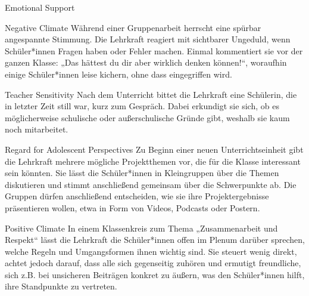 \begin{mapping}{Emotional Support}
    \begin{answer}
        Negative Climate
        \ismappedto
        Während einer Gruppenarbeit herrscht eine spürbar angespannte Stimmung. Die Lehrkraft reagiert mit sichtbarer Ungeduld, wenn Schüler*innen Fragen haben oder Fehler machen. Einmal kommentiert sie vor der ganzen Klasse: „Das hättest du dir aber wirklich denken können!“, woraufhin einige Schüler*innen leise kichern, ohne dass eingegriffen wird.
    \end{answer}
    \begin{answer}
        Teacher Sensitivity
        \ismappedto
        Nach dem Unterricht bittet die Lehrkraft eine Schülerin, die in letzter Zeit still war, kurz zum Gespräch. Dabei erkundigt sie sich, ob es möglicherweise schulische oder außerschulische Gründe gibt, weshalb sie kaum noch mitarbeitet.
    \end{answer}
    \begin{answer}
        Regard for Adolescent Perspectives
        \ismappedto
        Zu Beginn einer neuen Unterrichtseinheit gibt die Lehrkraft mehrere mögliche Projektthemen vor, die für die Klasse interessant sein könnten. Sie lässt die Schüler*innen in Kleingruppen über die Themen diskutieren und stimmt anschließend gemeinsam über die Schwerpunkte ab. Die Gruppen dürfen anschließend entscheiden, wie sie ihre Projektergebnisse präsentieren wollen, etwa in Form von Videos, Podcasts oder Postern.
    \end{answer}
    \begin{answer}
        Positive Climate
        \ismappedto
        In einem Klassenkreis zum Thema „Zusammenarbeit und Respekt“ lässt die Lehrkraft die Schüler*innen offen im Plenum darüber sprechen, welche Regeln und Umgangsformen ihnen wichtig sind. Sie steuert wenig direkt, achtet jedoch darauf, dass alle sich gegenseitig zuhören und ermutigt freundliche, sich z.B. bei unsicheren Beiträgen konkret zu äußern, was den Schüler*innen hilft, ihre Standpunkte zu vertreten.
    \end{answer}
\end{mapping}

